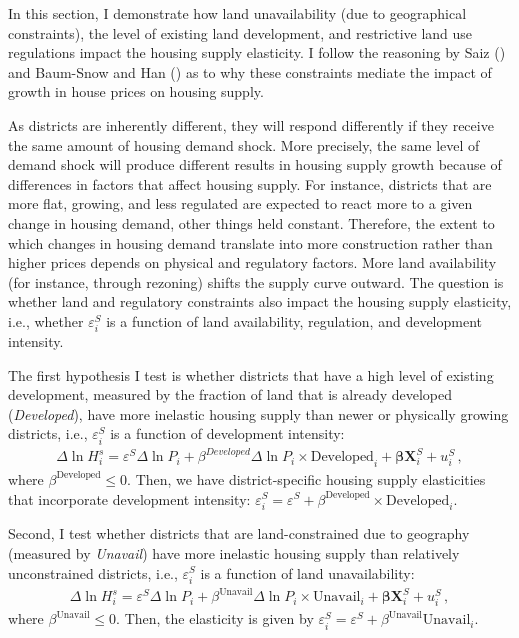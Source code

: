 \documentclass[
  12pt,
]{article}
\begin{document}
In this section, I demonstrate how land unavailability (due to geographical constraints), the level of existing land development, and restrictive land use regulations impact the housing supply elasticity. I follow the reasoning by Saiz () and Baum-Snow and Han () as to why these constraints mediate the impact of growth in house prices on housing supply.

As districts are inherently different, they will respond differently if they receive the same amount of housing demand shock. More precisely, the same level of demand shock will produce different results in housing supply growth because of differences in factors that affect housing supply. For instance, districts that are more flat, growing, and less regulated are expected to react more to a given change in housing demand, other things held constant. Therefore, the extent to which changes in housing demand translate into more construction rather than higher prices depends on physical and regulatory factors. More land availability (for instance, through rezoning) shifts the supply curve outward. The question is whether land and regulatory constraints also impact the housing supply elasticity, i.e., whether \(\varepsilon^S_i\) is a function of land availability, regulation, and development intensity.

The first hypothesis I test is whether districts that have a high level of existing development, measured by the fraction of land that is already developed (\emph{Developed}), have more inelastic housing supply than newer or physically growing districts, i.e., \(\varepsilon^S_i\) is a function of development intensity: \begin{align}
\Delta\ln H_i^s = \varepsilon^S\Delta\ln P_i + \beta^{Developed} \Delta \ln P_i\times\text{Developed}_i + \boldsymbol{\beta}\boldsymbol{X}_i^S + u^S_i\,, \label{eq:case-2}
\end{align} where \(\beta^{\text{Developed}} \le 0\). Then, we have district-specific housing supply elasticities that incorporate development intensity: \(\varepsilon^S_i = \varepsilon^S + \beta^{\text{Developed}}\times\text{Developed}_i\).

Second, I test whether districts that are land-constrained due to geography (measured by \emph{Unavail}) have more inelastic housing supply than relatively unconstrained districts, i.e., \(\varepsilon^S_i\) is a function of land unavailability: \begin{align}
\Delta\ln H_i^s = \varepsilon^S\Delta\ln P_i + \beta^{\text{Unavail}} \Delta \ln P_i\times\text{Unavail}_i + \boldsymbol{\beta}\boldsymbol{X}_i^S + u^S_i\,, \label{eq:case-3}
\end{align} where \(\beta^{\text{Unavail}} \le 0\). Then, the elasticity is given by \(\varepsilon^S_i = \varepsilon^S + \beta^{\text{Unavail}}\text{Unavail}_i\).
\end{document}

